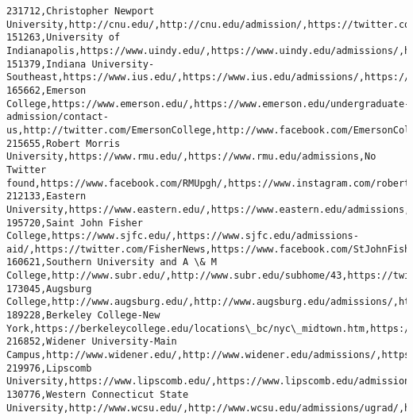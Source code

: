 \documentclass[11pt]{article}
\begin{document}
\begin{Verbatim}[commandchars=\\\{\}]
231712,Christopher Newport University,http://cnu.edu/,http://cnu.edu/admission/,https://twitter.com/cnucaptains,https://www.facebook.com/christophernewportuniversity,https://www.instagram.com/p/BpcpZdknb1r/
151263,University of Indianapolis,https://www.uindy.edu/,https://www.uindy.edu/admissions/,https://twitter.com/uindy,https://www.facebook.com/uindy,https://www.instagram.com/uindy
151379,Indiana University-Southeast,https://www.ius.edu/,https://www.ius.edu/admissions/,https://twitter.com/IUSoutheast,https://www.facebook.com/iusoutheast,https://www.instagram.com/p/BpZe8q4nFnx
165662,Emerson College,https://www.emerson.edu/,https://www.emerson.edu/undergraduate-admission/contact-us,http://twitter.com/EmersonCollege,http://www.facebook.com/EmersonCollege,http://instagram.com/emersoncollege
215655,Robert Morris University,https://www.rmu.edu/,https://www.rmu.edu/admissions,No Twitter found,https://www.facebook.com/RMUpgh/,https://www.instagram.com/robertmorrisuniversity/
212133,Eastern University,https://www.eastern.edu/,https://www.eastern.edu/admissions,https://twitter.com/easternU,https://www.facebook.com/EasternUniversity,https://www.instagram.com/p/BpZ6GDMB2kw/
195720,Saint John Fisher College,https://www.sjfc.edu/,https://www.sjfc.edu/admissions-aid/,https://twitter.com/FisherNews,https://www.facebook.com/StJohnFisherCollege/,https://www.instagram.com/stjohnfishercollege
160621,Southern University and A \& M College,http://www.subr.edu/,http://www.subr.edu/subhome/43,https://twitter.com/SouthernU\_BR,https://www.facebook.com/southernuniversitybatonrouge/,https://www.instagram.com/southernu\_br/
173045,Augsburg College,http://www.augsburg.edu/,http://www.augsburg.edu/admissions/,https://twitter.com/augsburgu,https://www.facebook.com/AugsburgUniversity/,https://www.instagram.com/p/Bo9Pb9BFh1G/
189228,Berkeley College-New York,https://berkeleycollege.edu/locations\_bc/nyc\_midtown.htm,https://berkeleycollege.edu/admissions.htm,https://twitter.com/berkeleycollege,https://www.facebook.com/BerkeleyCollegePage,https://www.instagram.com/berkeleycollege/
216852,Widener University-Main Campus,http://www.widener.edu/,http://www.widener.edu/admissions/,https://twitter.com/wideneruniv,https://www.facebook.com/wideneruniversity,https://www.instagram.com/wideneruniversity/
219976,Lipscomb University,https://www.lipscomb.edu/,https://www.lipscomb.edu/admissions,https://twitter.com/lipscomb,https://www.facebook.com/lipscombuniversity,https://instagram.com/lipscombuniversity
130776,Western Connecticut State University,http://www.wcsu.edu/,http://www.wcsu.edu/admissions/ugrad/,http://www.twitter.com/westconn,http://www.facebook.com/westconn,http://www.instagram.com/westconn

\end{Verbatim}
\end{document}
